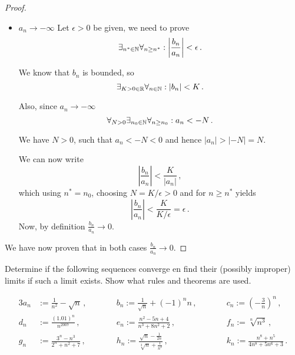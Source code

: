 \documentclass[week=3]{homework}
\begin{document}
\begin{questions}
\begin{parts}
\begin{proof}
\begin{itemize}
	    			\item $a_n \to - \infty$
	    			Let $\epsilon > 0$ be given, we need to prove
	    			\[
		    			\exists_{n^* \in \naturals} \forall_{n \ge n^*}: \left| \frac{b_n}{a_n} \right| < \epsilon\,.
	    			\]
	    			
		    		We know that $b_n$ is bounded, so
		    		\[
			    		\exists_{K > 0 \in \mathbb{R}} \forall_{n \in \mathbb{N}}: |b_n| < K\,.
		    		\]
		    		
		    		Also, since $a_n \to -\infty$
		    		\[
			    		\forall_{N > 0} \exists_{n_0 \in \mathbb{N}} \forall_{n \ge n_0}: a_n < -N\,.
		    		\]
		    		
		    		We have $N > 0$, such that $a_n < -N < 0$ and hence $|a_n| > |-N| = N$.
		    		
		    		We can now write
		    		\[
			    		\left|\frac{b_n}{a_n}\right| < \frac{K}{|a_n|}\,,
		    		\]
		    		which using $n^* = n_0$, choosing $N = K/\epsilon > 0$ and for $n \geq n^*$ yields 
		    		\[
			    		\left|\frac{b_n}{a_n}\right| < \frac{K}{K/\epsilon} = \epsilon\,.
		    		\]
		    		Now, by definition $\frac{b_n}{a_n} \to 0$.
	    		\end{itemize}
	    		
	    		We have now proven that in both cases $\frac{b_n}{a_n} \to 0$.
	    	\end{proof}
	    \end{parts}
    
	    \question
	    Determine if the following sequences converge en find their (possibly improper) limits if such a limit exists. Show what rules and theorems are used.
	    
	    \begin{alignat*}{3}
	    a_n &:= \frac{1}{n^2} - \sqrt n\,,  \qquad &&b_n := \frac{1}{\sqrt n } + (-1)^nn\,,\qquad &&c_n := \left(-\frac{3}{n}\right)^n\,, \\
	    d_n &:= \frac{(1.01)^n}{n^{2007}}\,, \qquad &&e_n := \frac{n^2-5n+4}{n^3+8n^2+2}\,, \qquad &&f_n := \sqrt[n]{n^3}\,, \\
	    g_n &:= \frac{3^n - n^3}{2^n + n^2 + 7}\,, \qquad &&h_n := \frac{\sqrt n - \frac{1}{2n}}{\sqrt[3]{n} + \frac{1}{n^2}}\,, \qquad &&k_n := \frac{n^8 + n^5}{4n^8 + 5n^6 + 3}\,.
	    \end{alignat*}
	    

\end{questions}
\end{document}
